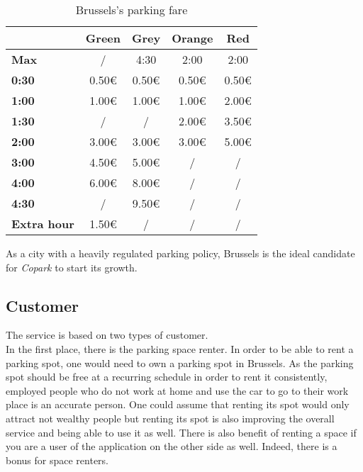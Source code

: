 \documentclass[12pt,a4paper,oneside]{book}
\newcommand{\bp}{\textit{Copark}}
\begin{document}
\begin{table}[h]
\centering
\caption{Brussels's parking fare}
\label{bxfare}
\begin{tabular}{@{}lcccc@{}}
\cmidrule(l){2-5}
\textbf{}                                 & \textbf{Green} & \textbf{Grey} & \textbf{Orange} & \textbf{Red} \\ \midrule
\multicolumn{1}{l}{\textbf{Max}}        & /              & 4:30          & 2:00            & 2:00         \\ \midrule
\multicolumn{1}{l}{\textbf{0:30}}       & 0.50\euro{}           & 0.50\euro{}          & 0.50\euro{}            & 0.50\euro{}         \\ \midrule
\multicolumn{1}{l}{\textbf{1:00}}       & 1.00\euro{}           & 1.00\euro{}          & 1.00\euro{}            & 2.00\euro{}         \\ \midrule
\multicolumn{1}{l}{\textbf{1:30}}       & /              & /             & 2.00\euro{}            & 3.50\euro{}         \\ \midrule
\multicolumn{1}{l}{\textbf{2:00}}       & 3.00\euro{}           & 3.00\euro{}          & 3.00\euro{}            & 5.00\euro{}         \\ \midrule
\multicolumn{1}{l}{\textbf{3:00}}       & 4.50\euro{}           & 5.00\euro{}          & /               & /            \\ \midrule
\multicolumn{1}{l}{\textbf{4:00}}       & 6.00\euro{}           & 8.00\euro{}          & /               & /            \\ \midrule
\multicolumn{1}{l}{\textbf{4:30}}       & /              & 9.50\euro{}          & /               & /            \\ \midrule
\multicolumn{1}{l}{\textbf{Extra hour}} & 1.50\euro{}           & /             & /               & /            \\ \bottomrule
\end{tabular}
\end{table}

As a city with a heavily regulated parking policy, Brussels is the ideal candidate for \bp{} to start its growth.

\subsection{Customer}
The service is based on two types of customer.\\

In the first place, there is the parking space renter. In order to be able to rent a parking spot, one would need to own a parking spot in Brussels. As the parking spot should be free at a recurring schedule in order to rent it consistently, employed people who do not work at home and use the car to go to their work place is an accurate person. One could assume that renting its spot would only attract not wealthy people but renting its spot is also improving the overall service and being able to use it as well. There is also benefit of renting a space if you are a user of the application on the other side as well. Indeed, there is a bonus for space renters.\\
\end{document}
